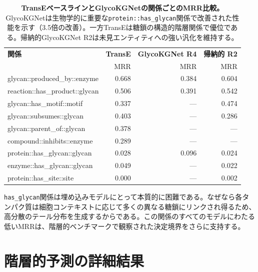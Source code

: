 \documentclass[11pt,a4paper]{ltjsarticle}
\begin{document}
\begin{table}[H]
\centering
\caption{\textbf{TransEベースラインとGlycoKGNetの関係ごとのMRR比較。}
GlycoKGNetは生物学的に重要な\texttt{protein::has\_glycan}関係で改善された性能を示す（3.5倍の改善）。一方TransEは糖鎖の構造的階層関係で優位である。帰納的GlycoKGNet R2は未見エンティティへの強い汎化を維持する。}
\label{tab:per_relation}
\small
\begin{tabular}{lrrr}
\toprule
\textbf{関係} & \textbf{TransE} & \textbf{GlycoKGNet R4} & \textbf{帰納的 R2} \\
 & MRR & MRR & MRR \\
\midrule
glycan::produced\_by::enzyme        & 0.668 & 0.384 & 0.604 \\
reaction::has\_product::glycan      & 0.506 & 0.391 & 0.542 \\
glycan::has\_motif::motif           & 0.337 & ---   & 0.474 \\
glycan::subsumes::glycan            & 0.403 & ---   & 0.286 \\
glycan::parent\_of::glycan          & 0.378 & ---   & --- \\
compound::inhibits::enzyme          & 0.289 & ---   & --- \\
\midrule
protein::has\_glycan::glycan        & 0.028 & 0.096 & 0.024 \\
enzyme::has\_glycan::glycan         & 0.049 & ---   & 0.022 \\
protein::has\_site::site            & 0.000 & ---   & 0.002 \\
\bottomrule
\end{tabular}
\end{table}

\texttt{has\_glycan}関係は埋め込みモデルにとって本質的に困難である。なぜなら各タンパク質は細胞コンテキストに応じて多くの異なる糖鎖にリンクされ得るため、高分散のテール分布を生成するからである。この関係のすべてのモデルにわたる低いMRRは、階層的ベンチマークで観察された決定境界をさらに支持する。

\section{階層的予測の詳細結果}
\label{sec:detailed_results}
\end{document}
